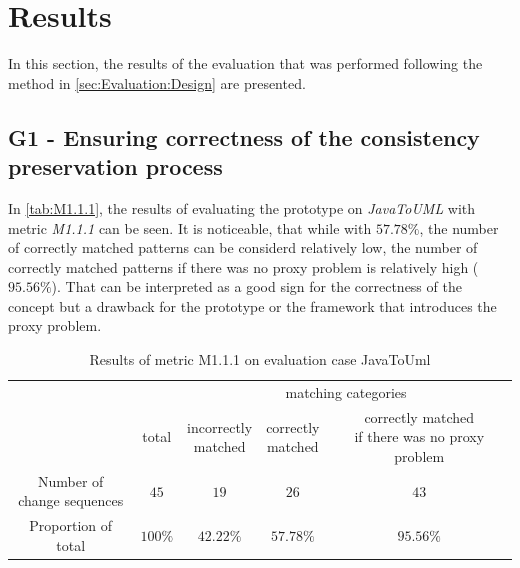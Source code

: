 
\section{Results}
\label{sec:Evaluation:Results}
In this section, the results of the evaluation that was performed following the method in \autoref{sec:Evaluation:Design} are presented.

\subsection{G1 - Ensuring correctness of the consistency preservation process}
\label{sec:Evaluation:Results:G1}
In \autoref{tab:M1.1.1}, the results of evaluating the prototype on \emph{JavaToUML} with metric \emph{M1.1.1} can be seen.
It is noticeable, that while with $57.78\%$, the number of correctly matched patterns can be considerd relatively low, the number of correctly matched patterns if there was no proxy problem is relatively high ($95.56\%$).
That can be interpreted as a good sign for the correctness of the concept but a drawback for the prototype or the framework that introduces the proxy problem. 
\begin{table}[h!]
\centering
\begin{tabular}{c | c  c c c}
    \toprule
     &      & \multicolumn{3}{c}{matching categories} \\
            & total & \makecell{incorrectly \\ matched} & \makecell{correctly \\ matched} & \makecell{correctly matched \\ if there was no proxy problem}\\
    \midrule
    \makecell{Number of \\ change sequences}  & $45$ & $19$ & $26$ & $43$\\
    Proportion of total    & $100\%$ & $42.22\%$ & $57.78\%$ & $95.56\%$ \\
    \bottomrule
\end{tabular}
\caption{Results of metric M1.1.1 on evaluation case JavaToUml}
\label{tab:M1.1.1}
\end{table}

